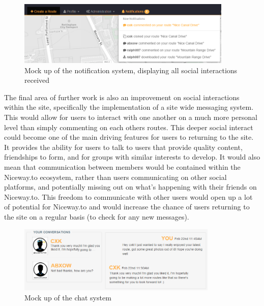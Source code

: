 \begin{figure}[!ht]
	\begin{center}
		\includegraphics[width=0.9125\textwidth]{images/further/notification.png}
	\end{center}
	\vspace{-6mm}
	\caption{Mock up of the notification system, displaying all social interactions received}	
\end{figure}

\noindent 
The final area of further work is also an improvement on social interactions within the site, specifically the implementation of a site wide messaging system. This would allow for users to interact with one another on a much more personal level than simply commenting on each others routes. This deeper social interact could become one of the main driving features for users to returning to the site. It provides the ability for users to talk to users that provide quality content, friendships to form, and for groups with similar interests to develop. It would also mean that communication between members would be contained within the Niceway.to ecosystem, rather than users communicating on other social platforms, and potentially missing out on what's happening with their friends on Niceway.to. This freedom to communicate with other users would open up a lot of potential for Niceway.to and would increase the chance of users returning to the site on a regular basis (to check for any new messages).

\begin{figure}[!ht]
	\begin{center}
		\includegraphics[width=0.85\textwidth]{images/further/chat.png}
	\end{center}
	\vspace{-6mm}
	\caption{Mock up of the chat system}	
	\vspace{-10mm}
\end{figure}

